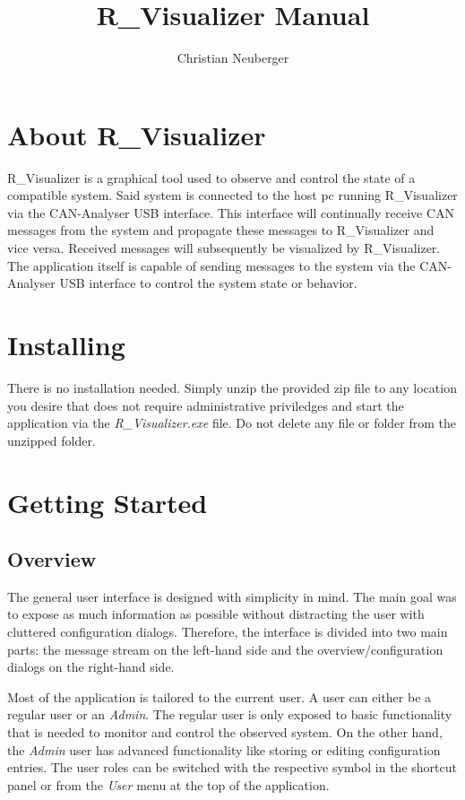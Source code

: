 \documentclass[12pt,a4paper]{scrartcl}
\author{Christian Neuberger}
\title{R\_Visualizer Manual}
\begin{document}
\maketitle
\newpage

\tableofcontents
\newpage

\section{About R\_Visualizer}
\label{sec:About}
R\_Visualizer is a graphical tool used to observe and control the state of a compatible system. Said system is connected to the host pc running R\_Visualizer via the CAN-Analyser USB interface. This interface will continually receive CAN messages from the system and propagate these messages to R\_Visualizer and vice versa. Received messages will subsequently be visualized by R\_Visualizer. The application itself is capable of sending messages to the system via the CAN-Analyser USB interface to control the system state or behavior.

\section{Installing}
\label{sec:Installing}
There is no installation needed. Simply unzip the provided zip file to any location you desire that does not require administrative priviledges and start the application via the \textit{R\_Visualizer.exe} file. Do not delete any file or folder from the unzipped folder.

\section{Getting Started}
\label{sec:GettingStarted}

\subsection{Overview}
\label{subsec:GettingStartedOverview}
The general user interface is designed with simplicity in mind. The main goal was to expose as much information as possible without distracting the user with cluttered configuration dialogs. Therefore, the interface is divided into two main parts: the message stream on the left-hand side and the overview/configuration dialogs on the right-hand side. 

Most of the application is tailored to the current user. A user can either be a regular user or an \textit{Admin}. The regular user is only exposed to basic functionality that is needed to monitor and control the observed system. On the other hand, the \textit{Admin} user has advanced functionality like storing or editing configuration entries. The user roles can be switched with the respective symbol in the shortcut panel or from the \textit{User} menu at the top of the application.
\end{document}
